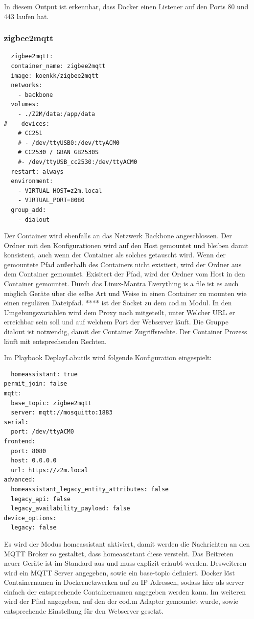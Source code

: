 In diesem Output ist erkennbar, dass Docker einen Listener auf den Ports 80 und 443 laufen hat.

\subsubsection{zigbee2mqtt}
\begin{lstlisting}
  zigbee2mqtt:
  container_name: zigbee2mqtt
  image: koenkk/zigbee2mqtt
  networks:
    - backbone
  volumes:
    - ./Z2M/data:/app/data
#    devices:
    # CC251
    # - /dev/ttyUSB0:/dev/ttyACM0
    # CC2530 / GBAN GB2530S
    #- /dev/ttyUSB_cc2530:/dev/ttyACM0
  restart: always
  environment:
    - VIRTUAL_HOST=z2m.local
    - VIRTUAL_PORT=8080
  group_add:
    - dialout
\end{lstlisting}

Der Container wird ebenfalls an das Netzwerk \grqq Backbone \grqq{} angeschlossen. Der Ordner mit den Konfigurationen wird auf den Host gemountet und 
bleiben damit konsistent, auch wenn der Container als solches getauscht wird. Wenn der gemountete Pfad außerhalb des Containers nicht existiert, wird der 
Ordner aus dem Container gemountet. Exisitert der Pfad, wird der Ordner vom Host in den Container gemountet. Durch das Linux-Mantra \grqq Everything is a file \grqq{}
ist es auch möglich Geräte über die selbe Art und Weise in einen Container zu mounten wie einen regulären Dateipfad. **** ist der Socket zu dem cod.m Modul.
In den Umgebungsvariablen wird dem Proxy noch mitgeteilt, unter Welcher URL er erreichbar sein soll und auf welchem Port der Webserver läuft. Die Gruppe 
\grqq dialout \grqq{} ist notwendig, damit der Container Zugriffsrechte. Der Container Prozess läuft mit entsprechenden Rechten.

Im Playbook \grqq DeplayLabutils \grqq{} wird folgende Konfiguration eingespielt:
\begin{lstlisting}
  homeassistant: true
permit_join: false
mqtt:
  base_topic: zigbee2mqtt
  server: mqtt://mosquitto:1883
serial:
  port: /dev/ttyACM0
frontend:
  port: 8080
  host: 0.0.0.0
  url: https://z2m.local
advanced:
  homeassistant_legacy_entity_attributes: false
  legacy_api: false
  legacy_availability_payload: false
device_options:
  legacy: false
\end{lstlisting}

Es wird der Modus \grqq homeassistant \grqq{} aktiviert, damit werden die Nachrichten an den MQTT Broker so gestaltet, dass homeassistant diese versteht.
Das Beitreten neuer Geräte ist im Standard aus und muss explizit erlaubt werden. Desweiteren wird ein MQTT Server angegeben, sowie ein \grqq base-topic \grqq{}
definiert. Docker löst Containernamen in Dockernetzwerken auf zu IP-Adressen, sodass hier als server einfach der entsprechende Containernamen angegeben werden
kann. Im weiteren wird der Pfad angegeben, auf den der cod.m Adapter gemountet wurde, sowie entsprechende Einstellung für den Webserver gesetzt.

